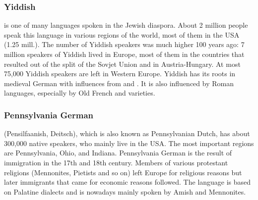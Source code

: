 




\subsubsection{Yiddish}

 is one of many languages spoken in the Jewish diaspora. About 2 million people speak this language in various
regions of the world, most of them in the USA (1.25 mill.). The number of Yiddish speakers was much
higher 100 years ago: 7 million speakers of Yiddish lived in Europe, most of them in the countries
that resulted out of the split of the Sovjet Union and in
Austria-Hungary. At most 75,000 Yiddish speakers are left in Western Europe. Yiddish has its roots
in medieval German with influences from  and . It is also influenced by
Roman languages, especially by Old French and  varieties.




\subsubsection{Pennsylvania German}

 (Pensilfaanish, Deitsch), which is also known as Pennsylvanian Dutch, has about 300,000
native speakers, who mainly live in the USA. The most important regions are Pennsylvania, Ohio, and
Indiana. Pennsylvania German is the result of immigration in the 17th and 18th century. Members of
various protestant religions (Mennonites, Pietists and so on) left Europe for religious reasons  
but later immigrants that came for economic reasons followed.  The language is
based on Palatine dialects and is nowadays mainly spoken by Amish and Mennonites.




